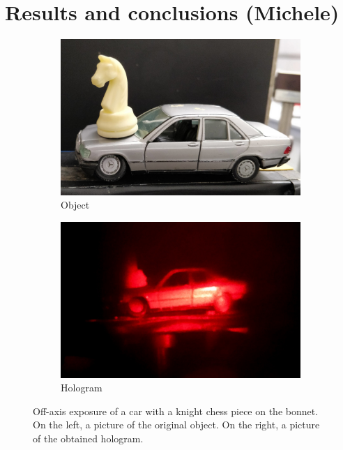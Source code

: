 \documentclass[11pt,a4paper]{article}
\begin{document}
\section{Results and conclusions (Michele)}

\begin{figure}[ht]
\centering
\begin{subfigure}[b]{0.45\textwidth}
\includegraphics[width=\textwidth]{car_knight}
\caption{Object}
\label{fig:car_knight}
\end{subfigure}
\begin{subfigure}[b]{0.45\textwidth}
\includegraphics[width=\textwidth]{Off-axis_hologram}
\caption{Hologram}
\label{fig:off_axis_hologram}
\end{subfigure}
\caption{Off-axis exposure of a car with a knight chess piece on the bonnet. On the left, a picture of the original object. On the right, a picture of the obtained hologram.}
\label{fig:off-axis_exposure}
\end{figure}
\end{document}
